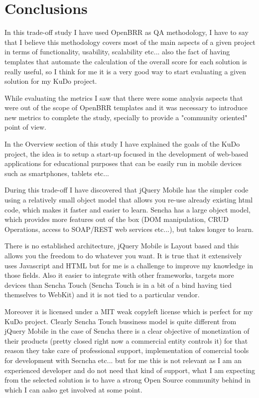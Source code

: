 \documentclass[a4paper,12pt]{book}
\begin{document}

\chapter{Conclusions}
\label{chap:conclusions}

In this trade-off study I have used OpenBRR as QA methodology, I have to say that I believe this methodology covers most of the main aspects of a given project in terms of functionality, usability, scalability etc... also the fact of having templates that automate the calculation of the overall score for each solution is really useful, so I think for me it is a very good way to start evaluating a given solution for my KuDo project.

While evaluating the metrics I saw that there were some analysis aspects that were out of the scope of OpenBRR templates and it was necessary to introduce new metrics to complete the study, specially to provide a "community oriented" point of view.

In the Overview section of this study I have explained the goals of the KuDo project, the idea is to setup a start-up focused in the development of web-based applications for educational purposes that can be easily run in mobile devices such as smartphones, tablets etc...

During this trade-off I have discovered that jQuery Mobile has the simpler code using a relatively small object model that allows you re-use already existing html code, which makes it faster and easier to learn. Sencha has a large object model, which provides more features out of the box (DOM manipulation, CRUD Operations, access to SOAP/REST web services etc...), but takes longer to learn.

There is no established architecture, jQuery Mobile is Layout based and this allows you the freedom to do whatever you want. It is true that it extensively uses Javascript and HTML but for me is a challenge to improve my knowledge in those fields. Also it easier to integrate with other frameworks, targets more devices than Sencha Touch (Sencha Touch is in a bit of a bind having tied themselves to WebKit) and it is not tied to a particular vendor.

Moreover it is licensed under a MIT weak copyleft license which is perfect for my KuDo project. Clearly Sencha Touch bussiness model is quite different from jQuery Mobile in the case of Sencha there is a clear objective of monetization of their products (pretty closed right now a commercial entity controls it) for that reason they take care of professional support, implementation of comercial tools for development with Secncha etc... but for me this is not relevant as I am an experienced developer and do not need that kind of support, what I am expecting from the selected solution is to have a strong Open Source community behind in which I can aalso get involved at some point.
\end{document}
